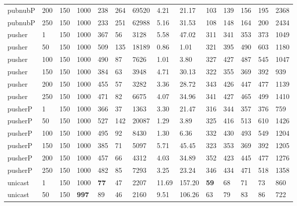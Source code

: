 \begin{table}[!htb]
\begin{tabular}{llllllllllllll}
		pubnubP & 200          & 150   & 1000 & 238  & 264  & 69520    & 4.21     & 21.17    & 103 & 139  & 156  & 195  & 2368  \\
		pubnubP & 250          & 150   & 1000 & 233  & 251  & 62988    & 5.16     & 31.53    & 108 & 148  & 164  & 200  & 2434  \\ \hline
		pusher     & 1            & 150   & 1000 & 367  & 56   & 3128     & 5.58     & 47.02    & 311 & 341  & 353  & 373  & 1049  \\
		pusher     & 50           & 150   & 1000 & 509  & 135  & 18189    & 0.86     & 1.01     & 321 & 395  & 490  & 603  & 1180  \\
		pusher     & 100          & 150   & 1000 & 490  & 87   & 7626     & 1.01     & 3.80     & 327 & 427  & 487  & 545  & 1047  \\
		pusher     & 150          & 150   & 1000 & 384  & 63   & 3948     & 4.71     & 30.13    & 322 & 355  & 369  & 392  & 939   \\
		pusher     & 200          & 150   & 1000 & 455  & 57   & 3282     & 3.36     & 28.72    & 343 & 426  & 447  & 477  & 1139  \\
		pusher     & 250          & 150   & 1000 & 471  & 82   & 6675     & 4.07     & 34.96    & 341 & 427  & 465  & 499  & 1410  \\ \hline
		pusherP & 1            & 150   & 1000 & 366  & 37   & 1363     & 3.30     & 21.47    & 316 & 344  & 357  & 376  & 759   \\
		pusherP & 50           & 150   & 1000 & 527  & 142  & 20087    & 1.29     & 3.89     & 325 & 416  & 513  & 610  & 1426  \\
		pusherP & 100          & 150   & 1000 & 495  & 92   & 8430     & 1.30     & 6.36     & 332 & 430  & 493  & 549  & 1204  \\
		pusherP & 150          & 150   & 1000 & 385  & 71   & 5097     & 5.71     & 45.45    & 323 & 353  & 369  & 392  & 1205  \\
		pusherP & 200          & 150   & 1000 & 457  & 66   & 4312     & 4.03     & 34.89    & 352 & 423  & 445  & 477  & 1276  \\
		pusherP & 250          & 150   & 1000 & 482  & 85   & 7293     & 3.25     & 23.24    & 346 & 434  & 471  & 518  & 1358  \\ \hline
		unicast & 1            & 150   & 1000 & \textbf{77}   & 47   & 2207     & 11.69    & 157.20   & \textbf{59}  & 68   & 71   & 73   & 860   \\
		unicast & 50           & 150   & \textbf{997}  & 89   & 46   & 2160     & 9.51     & 106.26   & 63  & 79   & 83   & 86   & 722   \\

\end{tabular}
\end{table}

